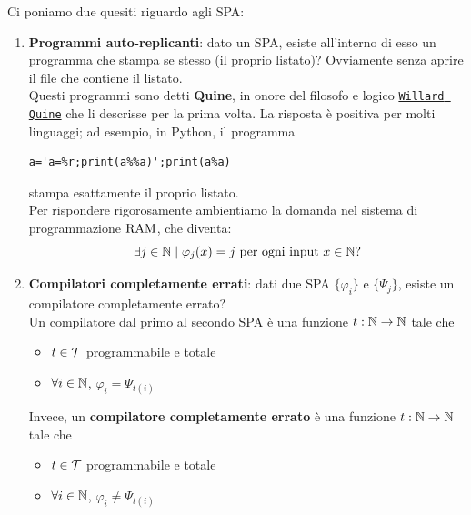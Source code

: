 Ci poniamo due quesiti riguardo agli SPA:
\begin{enumerate}
	\item \textbf{Programmi auto-replicanti}: dato un SPA, esiste all'interno di esso un programma che stampa se stesso (il proprio listato)? Ovviamente senza aprire il file che contiene il listato.\\
	
	Questi programmi sono detti \textbf{Quine}, in onore del filosofo e logico \href{https://it.wikipedia.org/wiki/Willard_Van_Orman_Quine}{\texttt{Willard Quine}} che li descrisse per la prima volta. La risposta è positiva per molti linguaggi; ad esempio, in Python, il programma
	\begin{verbatim}
a='a=%r;print(a%%a)';print(a%a)
	\end{verbatim}
	stampa esattamente il proprio listato. \\
	
	Per rispondere rigorosamente ambientiamo la domanda nel sistema di programmazione $\text{RAM}$, che diventa: 
	$$ \exists j \in \mathbb{N} \mid \varphi_j (x) = j \text{ per ogni input } x \in \mathbb{N} \text{?}$$
	
	\item \textbf{Compilatori completamente errati}: dati due SPA $\{\varphi_i\}$ e $\{\Psi_j\}$, esiste un compilatore completamente errato? \\
	
	Un compilatore dal primo al secondo SPA è una funzione $t: \mathbb{N} \rightarrow \mathbb{N}$ tale che
	\begin{itemize}
		\item $t \in \mathcal{T}$ programmabile e totale
		\item $\forall i \in \mathbb{N}$, $\varphi_i = \Psi_{t(i)}$
	\end{itemize}
	
	Invece, un \textbf{compilatore completamente errato} è una funzione $t: \mathbb{N} \rightarrow \mathbb{N}$ tale che
	\begin{itemize}
		\item $t \in \mathcal{T}$ programmabile e totale
		\item $\forall i \in \mathbb{N}$, $\varphi_i \neq \Psi_{t(i)}$
	\end{itemize}
\end{enumerate}

